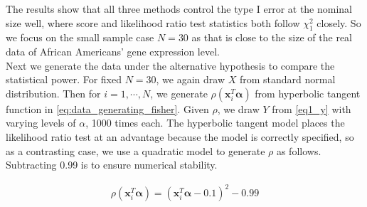 \documentclass[aoas,preprint]{imsart}
\numberwithin{equation}{section}
\theoremstyle{plain}
\begin{document}
The results show that all three methods control the type I error at the nominal size well, where score and likelihood ratio test statistics both follow $\chi_1^2$ closely. So we focus on the small sample case $N=30$ as that is close to the size of the real data of African Americans' gene expression level.\\

Next we generate the data under the alternative hypothesis to compare the statistical power. For fixed $N=30$, we again draw $X$ from standard normal distribution. Then for $i = 1, \cdots, N$, we generate $\rho(\bm{x}_i^T\bm{\alpha})$ from hyperbolic tangent function in \ref{eq:data_generating_fisher}. Given $\rho$, we draw $Y$ from \ref{eq1_y} with varying levels of $\alpha$, 1000 times each. The hyperbolic tangent model places the likelihood ratio test at an advantage because the model is correctly specified, so as a contrasting case, we use a quadratic model to generate $\rho$ as follows. Subtracting 0.99 is to ensure numerical stability.

\begin{align}
    \rho(\bm{x}_i^T\bm{\alpha}) = (\bm{x}_i^T\bm{\alpha} - 0.1)^2 - 0.99
    \label{eq:data_generating2_quadratic}
\end{align}
\end{document}
